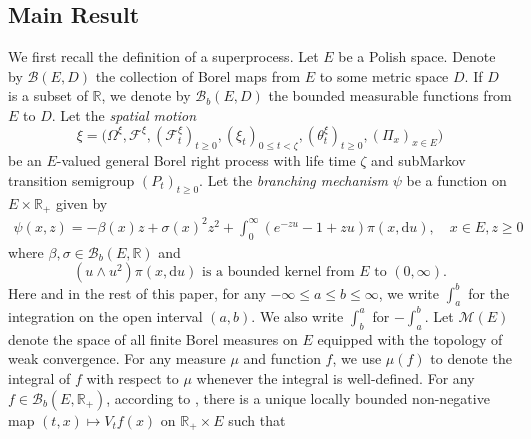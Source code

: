 \documentclass[12pt,a4paper]{amsart}
\numberwithin{equation}{section}
\theoremstyle{plain}
\theoremstyle{definition}
\theoremstyle{remark}
\begin{document}
\subsection{Main Result}\label{sec:M}
	We first recall the definition of a superprocess.
	Let $E$ be a Polish space.
	Denote by $\mathcal B(E, D)$ the collection of Borel maps  from $E$ to some metric space $D$.
	If $D$ is a subset of $\mathbb R$, we denote by $\mathcal B_b(E,D)$ the bounded measurable functions from $E$ to $D$.
	Let the \emph{spatial motion} \[\xi= \big(\Omega^\xi, \mathscr F^\xi, (\mathscr F^\xi_t)_{t\geq 0}, (\xi_t)_{0\leq t< \zeta}, (\theta^\xi_t)_{t\geq 0}, (\Pi_x)_{x\in E}\big)\] be an $E$-valued general Borel right process with life time $\zeta$ and subMarkov transition semigroup $(P_t)_{t\geq 0}$.
	Let the \emph{branching mechanism} $\psi$ be a function on $E \times \mathbb R_+$ given by
\begin{align}
	\psi(x,z)
	= -\beta(x) z + \sigma(x)^2 z^2 + \int_0^\infty (e^{-zu} -1 + zu) \pi(x,{\mathrm d}u),
	\quad x\in E, z\geq 0
\end{align}
	where $\beta, \sigma \in \mathcal B_b(E,\mathbb R)$ and
\begin{equation} \label{eq:M.01}
	\text{$(u \wedge u^2) \pi(x,{\mathrm d}u)$ is a bounded kernel from $E$ to $(0,\infty)$.}
\end{equation}
	Here and in the rest of this paper, for any $-\infty \leq a \leq b \leq \infty$, we write $\int_a^b$ for the integration on the open interval $(a,b)$.
	We also write $\int_b^a$ for $- \int_a^b$.
	Let $\mathcal M(E)$ denote the space of all finite Borel measures on $E$ equipped with the topology of weak convergence. 
	For any measure $\mu$ and function $f$, we use $\mu(f)$ to denote the integral of $f$ with respect to $\mu$ whenever the integral is well-defined.
	For any $f \in \mathcal B_b(E,\mathbb R_+)$, according to \cite[Proposition 2.20]{Li2011Measure-valued}, there is a unique locally bounded non-negative map $(t,x)\mapsto V_tf(x)$ on $\mathbb R_+\times E$ such that
\end{document}
